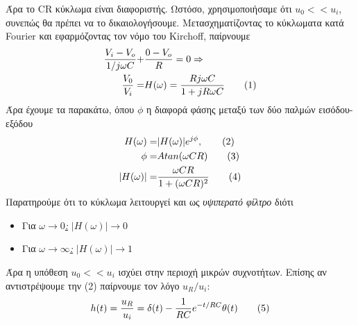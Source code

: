 \documentclass[a4paper]{article}
\newcommand\numberthis{\addtocounter{equation}{1}\tag{\theequation}}
\begin{document}
	Άρα το CR κύκλωμα είναι διαφοριστής. Ωστόσο, χρησιμοποιήσαμε ότι $u_0 << u_i$, συνεπώς θα πρέπει να το δικαιολογήσουμε. Μετασχηματίζοντας το κύκλωματα κατά Fourier και εφαρμόζοντας τον νόμο του Kirchoff, παίρνουμε
		\begin{align*}
			\frac{V_i-V_o}{1/j\omega C} +& \frac{0-V_o}{R} = 0 \Rightarrow \\ 
			\frac{V_0}{V_i} =& H(\omega) =  \frac{Rj\omega C}{1+jR\omega C} \numberthis
		\end{align*}
	Άρα έχουμε τα παρακάτω, όπου $\phi$ η διαφορά φάσης μεταξύ των δύο παλμών εισόδου-εξόδου
		\begin{align*}
			H(\omega) =& |H(\omega)| e^{j\phi}, \numberthis \\ 
				\phi =& Atan(\omega CR) \numberthis \\ 
				|H(\omega)| = & \frac{\omega CR}{1+(\omega CR)^2} \numberthis
		\end{align*}
	Παρατηρούμε ότι το κύκλωμα λειτουργεί και ως \textit{υψιπερατό φίλτρο} διότι
		\begin{itemize}
		 	\item Για \underline{\textit{$\omega\rightarrow 0$:}} $|H(\omega)|\rightarrow 0$
		 	
		 	\item Για \underline{\textit{$\omega\rightarrow\infty$:}} $|H(\omega)|\rightarrow 1$
		\end{itemize}	
	Άρα η υπόθεση $u_0 << u_i$ ισχύει στην περιοχή μικρών συχνοτήτων.
	Επίσης αν {αντιστρέψουμε} την (2) παίρνουμε τον λόγο $u_R/u_i$: 
		\begin{align*}
			h(t)=\frac{u_R}{u_i}=\delta(t) - \frac{1}{RC}e^{-t/RC}\theta(t) \numberthis
		\end{align*}
\end{document}
